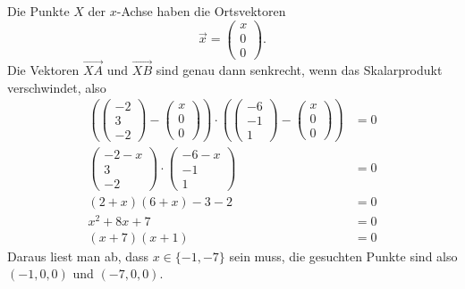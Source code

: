 \begin{loesung}
Die Punkte $X$ der $x$-Achse haben die Ortsvektoren
\[
\vec x=\begin{pmatrix}x\\0\\0\end{pmatrix}
.
\]
Die Vektoren $\overset{\rightarrow}{XA}$ und $\overset{\rightarrow}{XB}$ sind
genau dann senkrecht, wenn das Skalarprodukt verschwindet, also
\begin{align*}
\left(
\begin{pmatrix}-2\\3\\-2\end{pmatrix}
-
\begin{pmatrix}x\\0\\0\end{pmatrix}
\right)\cdot\left(
\begin{pmatrix}-6\\-1\\1\end{pmatrix}
-
\begin{pmatrix}x\\0\\0\end{pmatrix}
\right)
&=0
\\
\begin{pmatrix}-2-x\\3\\-2\end{pmatrix}
\cdot
\begin{pmatrix}-6-x\\-1\\1\end{pmatrix}
&=0
\\
(2+x)(6+x)-3-2&=0\\
x^2+8x+7&=0\\
(x+7)(x+1)&=0
\end{align*}
Daraus liest man ab, dass $x\in\{-1,-7\}$ sein muss, die gesuchten Punkte
sind also $(-1,0,0)$ und $(-7,0,0)$.
\end{loesung}

